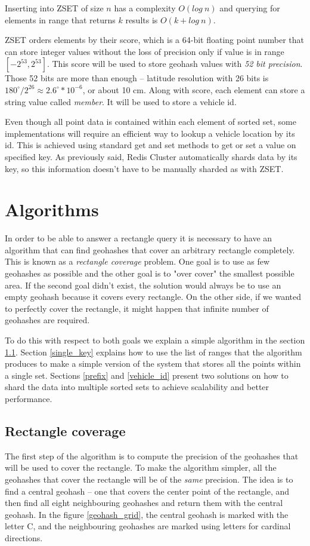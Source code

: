 \documentclass[times, utf8, diplomski]{fer}
\begin{document}
Inserting into ZSET of size $n$ has a complexity $O(log\ n)$ and querying for elements in range that returns $k$ results is $O(k+log\ n)$.

ZSET orders elements by their score, which is a 64-bit floating point number that can store integer values without the loss of precision only if value is in range $[-2^{53}, 2^{53}]$. This score will be used to store geohash values with \emph{52 bit precision}. Those 52 bits are more than enough -- latitude resolution with 26 bits is $180^{\circ}/2^{26} \approx 2.6^{\circ}*10^{-6}$, or about 10 cm. Along with score, each element can store a string value called \emph{member}. It will be used to store a vehicle id.

Even though all point data is contained within each element of sorted set, some implementations will require an efficient way to lookup a vehicle location by its id. This is achieved using standard get and set methods to get or set a value on specified key. As previously said, Redis Cluster automatically shards data by its key, so this information doesn't have to be manually sharded as with ZSET.

\chapter {Algorithms} \label {algorithms}
In order to be able to answer a rectangle query it is necessary to have an algorithm that can find geohashes that cover an arbitrary rectangle completely. This is known as a \emph{rectangle coverage} problem. One goal is to use as few geohashes as possible and the other goal is to "over cover" the smallest possible area. If the second goal didn't exist, the solution would always be to use an empty geohash because it covers every rectangle. On the other side, if we wanted to perfectly cover the rectangle, it might happen that infinite number of geohashes are required.

To do this with respect to both goals we explain a simple algorithm in the section \ref{rect_cov}.
Section \ref{single_key} explains how to use the list of ranges that the algorithm produces to make a simple version of the system that stores all the points within a single set. Sections \ref{prefix} and \ref{vehicle_id} present two solutions on how to shard the data into multiple sorted sets to achieve scalability and better performance.

\section {Rectangle coverage} \label {rect_cov}
The first step of the algorithm is to compute the precision of the geohashes that will be used to cover the rectangle. To make the algorithm simpler, all the geohashes that cover the rectangle will be of the \emph{same} precision.
The idea is to find a central geohash -- one that covers the center point of the rectangle, and then find all eight neighbouring geohashes and return them with the central geohash. In the figure \ref{geohash_grid}, the central geohash is marked with the letter C, and the neighbouring geohashes are marked using letters for cardinal directions.
\end{document}
